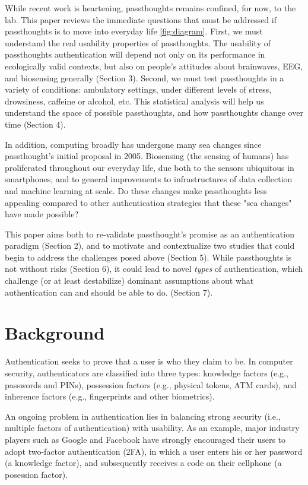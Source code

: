 \documentclass[sigconf]{acmart}
\begin{document}
While recent work is heartening, passthoughts remains confined, for now, to the lab.
This paper reviews the immediate questions that must be addressed if passthoughts is to move into everyday life \ref{fig:diagram}.
First, we must understand the real usability properties of passthoughts.
The usability of passthoughts authentication will depend not only on its performance in ecologically valid contexts,
but also on people's attitudes about brainwaves, EEG, and biosensing generally (Section 3).
Second, we must test passthoughts in a variety of conditions: ambulatory settings, under different levels of stress, drowsiness, caffeine or alcohol, etc.
This statistical analysis will help us understand 
the space of possible passthoughts,
and how passthoughts change over time (Section 4).

In addition, computing broadly has undergone many sea changes since passthought's initial proposal in 2005.
Biosensing (the sensing of humans) has proliferated throughout our everyday life, due both to the sensors ubiquitous in smartphones, and to general improvements to infrastructures of data collection and machine learning at scale. 
Do these changes make passthoughts less appealing compared to other authentication strategies that these "sea changes" have made possible? 

This paper aims both to re-validate passthought's promise as an authentication paradigm (Section 2), and to 
motivate and contextualize two studies that could begin to address the challenges posed above (Section 5).
While passthoughts is not without risks (Section 6),
it could lead to novel \emph{types} of authentication,
which challenge (or at least destabilize) dominant assumptions about what authentication 
can and should be able to do. (Section 7).

\section{Background}
\label{sec:org6827efb}

Authentication seeks to prove that a user is who they claim to be.
In computer security, authenticators are classified into three types: knowledge factors (e.g., passwords
and PINs), possession factors (e.g., physical tokens, ATM cards), and inherence
factors (e.g., fingerprints and other biometrics). 

An ongoing problem in authentication lies in balancing strong security
(i.e., multiple factors of authentication)
with usability.
As an example, major industry players such as Google and
Facebook have strongly encouraged their users to adopt two-factor
authentication (2FA), in which a user enters his or her password (a knowledge factor),
and subsequently receives a code on their cellphone (a posession factor).
\end{document}
